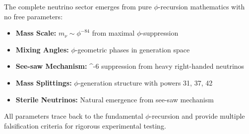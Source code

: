 The complete neutrino sector emerges from pure $\phi$-recursion mathematics with no free parameters:

\begin{itemize}
\item \textbf{Mass Scale:} $m_\nu \sim \phi^{-84}$ from maximal $\phi$-suppression
\item \textbf{Mixing Angles:} $\phi$-geometric phases in generation space
\item \textbf{See-saw Mechanism:} \phi^{-6} suppression from heavy right-handed neutrinos
\item \textbf{Mass Splittings:} $\phi$-generation structure with powers 31, 37, 42
\item \textbf{Sterile Neutrinos:} Natural emergence from see-saw mechanism
\end{itemize}

All parameters trace back to the fundamental $\phi$-recursion and provide multiple falsification criteria for rigorous experimental testing.